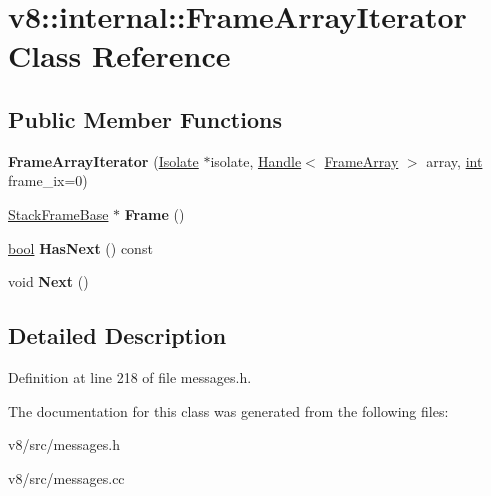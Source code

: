 \hypertarget{classv8_1_1internal_1_1FrameArrayIterator}{}\section{v8\+:\+:internal\+:\+:Frame\+Array\+Iterator Class Reference}
\label{classv8_1_1internal_1_1FrameArrayIterator}
\subsection*{Public Member Functions}
\begin{DoxyCompactItemize}
\item 
\mbox{\label{classv8_1_1internal_1_1FrameArrayIterator_af5f26ab6983d65b28235a97e15031770}} 
{\bfseries Frame\+Array\+Iterator} (\mbox{\hyperlink{classv8_1_1internal_1_1Isolate}{Isolate}} $\ast$isolate, \mbox{\hyperlink{classv8_1_1internal_1_1Handle}{Handle}}$<$ \mbox{\hyperlink{classv8_1_1internal_1_1FrameArray}{Frame\+Array}} $>$ array, \mbox{\hyperlink{classint}{int}} frame\+\_\+ix=0)
\item 
\mbox{\label{classv8_1_1internal_1_1FrameArrayIterator_aea7208caaa1d8fa8b7a3cdfb502d648b}} 
\mbox{\hyperlink{classv8_1_1internal_1_1StackFrameBase}{Stack\+Frame\+Base}} $\ast$ {\bfseries Frame} ()
\item 
\mbox{\label{classv8_1_1internal_1_1FrameArrayIterator_acf7ad40e91105028544425aa5b33930d}} 
\mbox{\hyperlink{classbool}{bool}} {\bfseries Has\+Next} () const
\item 
\mbox{\label{classv8_1_1internal_1_1FrameArrayIterator_a6cede5e332797dd0c01a642fccf43944}} 
void {\bfseries Next} ()
\end{DoxyCompactItemize}


\subsection{Detailed Description}


Definition at line 218 of file messages.\+h.



The documentation for this class was generated from the following files\+:\begin{DoxyCompactItemize}
\item 
v8/src/messages.\+h\item 
v8/src/messages.\+cc\end{DoxyCompactItemize}
